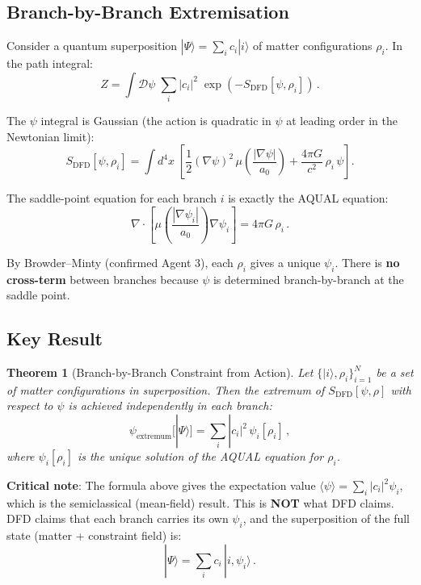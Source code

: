 \documentclass[11pt,a4paper]{article}
\newtheorem{theorem}{Theorem}
\begin{document}
\subsection{Branch-by-Branch Extremisation}

Consider a quantum superposition $|\Psi\rangle = \sum_i c_i |i\rangle$ of matter configurations $\rho_i$. In the path integral:
\begin{equation}
Z = \int \mathcal{D}\psi\;\sum_i |c_i|^2\;\exp\left(-S_{\mathrm{DFD}}[\psi, \rho_i]\right)\,.
\end{equation}

The $\psi$ integral is Gaussian (the action is quadratic in $\psi$ at leading order in the Newtonian limit):
\begin{equation}
S_{\mathrm{DFD}}[\psi, \rho_i] = \int d^4x\;\left[\frac{1}{2}(\nabla\psi)^2\,\mu\!\left(\frac{|\nabla\psi|}{a_0}\right) + \frac{4\pi G}{c^2}\,\rho_i\,\psi\right].
\end{equation}

The saddle-point equation for each branch $i$ is exactly the AQUAL equation:
\begin{equation}
\nabla \cdot \left[\mu\!\left(\frac{|\nabla\psi_i|}{a_0}\right)\nabla\psi_i\right] = 4\pi G\,\rho_i\,.
\end{equation}

By Browder--Minty (confirmed Agent 3), each $\rho_i$ gives a unique $\psi_i$. There is \textbf{no cross-term} between branches because $\psi$ is determined branch-by-branch at the saddle point.

\subsection{Key Result}

\begin{theorem}[Branch-by-Branch Constraint from Action]
Let $\{|i\rangle, \rho_i\}_{i=1}^N$ be a set of matter configurations in superposition. Then the extremum of $S_{\mathrm{DFD}}[\psi, \rho]$ with respect to $\psi$ is achieved independently in each branch:
\begin{equation}
\psi_{\mathrm{extremum}}[|\Psi\rangle] = \sum_i |c_i|^2\,\psi_i[\rho_i]\,,
\end{equation}
where $\psi_i[\rho_i]$ is the unique solution of the AQUAL equation for $\rho_i$.
\end{theorem}

\textbf{Critical note}: The formula above gives the expectation value $\langle\psi\rangle = \sum_i |c_i|^2\psi_i$, which is the semiclassical (mean-field) result. This is \textbf{NOT} what DFD claims. DFD claims that each branch carries its own $\psi_i$, and the superposition of the full state (matter + constraint field) is:
\begin{equation}
|\Psi\rangle = \sum_i c_i\,|i, \psi_i\rangle\,.
\end{equation}
\end{document}
